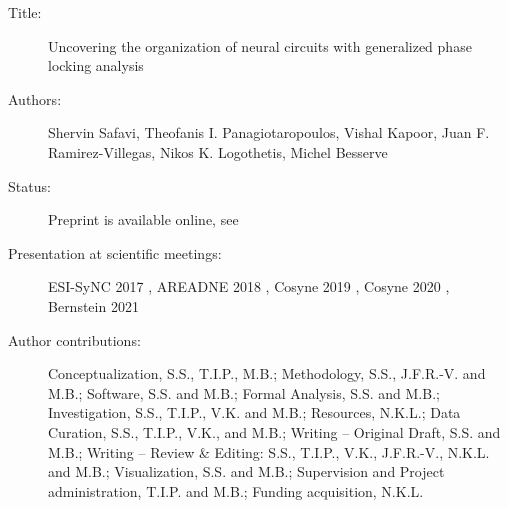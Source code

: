 \begin{description}
\item[Title:] Uncovering the organization of neural circuits with generalized phase locking analysis
\item[Authors:]
  Shervin Safavi,
  Theofanis I. Panagiotaropoulos,
  Vishal Kapoor,
  Juan F. Ramirez-Villegas,
  Nikos K. Logothetis,
  Michel Besserve
\item[Status:]
  Preprint is available online, see \citet{safaviUncoveringOrganizationNeural2020a}
\item[Presentation at scientific meetings:]
  ESI-SyNC 2017 \cite{safaviGeneralizedPhaseLocking2017},
  AREADNE 2018 \cite{safaviGeneralizedPhaseLocking2018},
  Cosyne 2019 \cite{besserveGeneralizedPhaseLocking2019},
  Cosyne 2020 \cite{safaviUncoveringOrganizationNeural2020b},
  Bernstein 2021 \cite{safaviGeneralizedPhaseLocking2021}
\item[Author contributions: ]

  Conceptualization, S.S., T.I.P., M.B.;
  Methodology, S.S., J.F.R.-V. and M.B.;
  Software, S.S. and M.B.;
  Formal Analysis, S.S. and M.B.;
  Investigation, S.S., T.I.P., V.K. and M.B.;
  Resources, N.K.L.;
  Data Curation, S.S., T.I.P., V.K., and M.B.;
  Writing -- Original Draft, S.S. and M.B.;
  Writing -- Review \& Editing: S.S., T.I.P., V.K., J.F.R.-V., N.K.L. and M.B.;
  Visualization, S.S. and M.B.;
  Supervision and Project administration, T.I.P. and M.B.;
  Funding acquisition, N.K.L.

\end{description}

